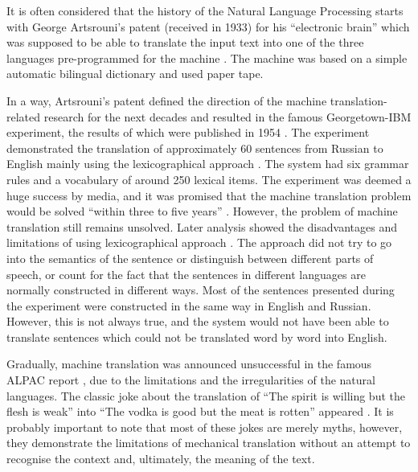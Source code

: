 It is often considered that the history of the Natural Language Processing starts with George Artsrouni's patent (received in 1933) for his ``electronic brain'' which was supposed to be able to translate the input text into one of the three languages pre-programmed for the machine \cite{hutchins2004two}. The machine was based on a simple automatic bilingual dictionary and used paper tape. 

In a way, Artsrouni's patent defined the direction of the machine translation-related research for the next decades and resulted in the famous Georgetown-IBM experiment, the results of which were published in 1954 \cite{dostert1955georgetown}. The experiment demonstrated the translation of approximately 60 sentences from Russian to English mainly using the lexicographical approach \cite{hutchins2004georgetown}. The system had six grammar rules and a vocabulary of around 250 lexical items. The experiment was deemed a huge success by media, and it was promised that the machine translation problem would be solved ``within three to five years'' \cite{plumb1954russian}. However, the problem of machine translation still remains unsolved. Later analysis showed the disadvantages and limitations of using lexicographical approach \cite{garvin1968georgetown}. The approach did not try to go into the semantics of the sentence or distinguish between different parts of speech, or count for the fact that the sentences in different languages are normally constructed in different ways. Most of the sentences presented during the experiment were constructed in the same way in English and Russian. However, this is not always true, and the system would not have been able to translate sentences which could not be translated word by word into English. 

Gradually, machine translation was announced unsuccessful in the famous ALPAC report \cite{national1966language}, due to the limitations and the irregularities of the natural languages. The classic joke about the translation of ``The spirit is willing but the flesh is weak'' into ``The vodka is good but the meat is rotten'' appeared \cite{hutchins1995whisky}. It is probably important to note that most of these jokes are merely myths, however, they demonstrate the limitations of mechanical translation without an attempt to recognise the context and, ultimately, the meaning of the text.

